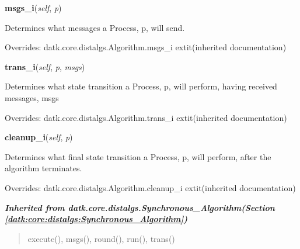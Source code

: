     \vspace{0.5ex}

\hspace{.8\funcindent}\begin{boxedminipage}{\funcwidth}

    \raggedright \textbf{msgs\_i}(\textit{self}, \textit{p})

\setlength{\parskip}{2ex}
    Determines what messages a Process, p, will send.

\setlength{\parskip}{1ex}
      Overrides: datk.core.distalgs.Algorithm.msgs\_i 	extit{(inherited documentation)}

    \end{boxedminipage}

    \vspace{0.5ex}

\hspace{.8\funcindent}\begin{boxedminipage}{\funcwidth}

    \raggedright \textbf{trans\_i}(\textit{self}, \textit{p}, \textit{msgs})

\setlength{\parskip}{2ex}
    Determines what state transition a Process, p, will perform, having 
    received messages, msgs

\setlength{\parskip}{1ex}
      Overrides: datk.core.distalgs.Algorithm.trans\_i 	extit{(inherited documentation)}

    \end{boxedminipage}

    \vspace{0.5ex}

\hspace{.8\funcindent}\begin{boxedminipage}{\funcwidth}

    \raggedright \textbf{cleanup\_i}(\textit{self}, \textit{p})

\setlength{\parskip}{2ex}
    Determines what final state transition a Process, p, will perform, 
    after the algorithm terminates.

\setlength{\parskip}{1ex}
      Overrides: datk.core.distalgs.Algorithm.cleanup\_i 	extit{(inherited documentation)}

    \end{boxedminipage}


\large{\textbf{\textit{Inherited from datk.core.distalgs.Synchronous\_Algorithm\textit{(Section \ref{datk:core:distalgs:Synchronous_Algorithm})}}}}

\begin{quote}
execute(), msgs(), round(), run(), trans()
\end{quote}

